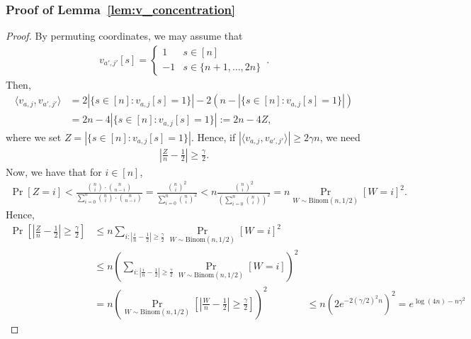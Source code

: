 \subsubsection{Proof of Lemma~\ref{lem:v_concentration}\label{sssec:lem:v_concentration}}
\begin{proof} By permuting coordinates, we may assume that 
\begin{align*}
v_{a',j'}[s] = \begin{cases} 1 & s \in [n]\\
-1 & s \in \{n+1,\dots,2n\}\end{cases}\,.
\end{align*}
Then,
\begin{align*}
\langle v_{a,j} , v_{a',j'}\rangle &= 2|\{s\in [n]: v_{a,j}[s] = 1\}| - 2(n - |\{s\in [n]: v_{a,j}[s] = 1\}|) \\
&= 2n - 4|\{s\in [n]: v_{a,j}[s] = 1\}| := 2n - 4Z,
\end{align*}
where we set $Z = |\{s\in [n]: v_{a,j}[s] = 1\}|$. Hence, if $|\langle v_{a,j} , v_{a',j'}\rangle|  \ge 2\gamma n$, we need
\begin{align*}
\left|\frac{Z}{n} - \frac{1}{2}\right| \ge \frac{\gamma}{2}.
\end{align*}
Now, we have that for $i \in [n]$,
\begin{align*}
\Pr[Z = i] < \frac{\binom{n}{i} \cdot \binom{n}{n-i}}{\sum_{i=0}^n \binom{n}{i} \cdot \binom{n}{n-i}} = \frac{\binom{n}{i}^2}{\sum_{i=0}^n \binom{n}{i}^2} < n\frac{\binom{n}{i}^2}{\left(\sum_{i=0}^n \binom{n}{i}\right)^2} = n\Pr_{W \sim \mathrm{Binom}(n,1/2)}[W=i]^2.
\end{align*}
Hence, 
\begin{align*}
\Pr\left[\left|\frac{Z}{n} - \frac{1}{2}\right| \ge \frac{\gamma}{2}\right] &\le n\sum_{i:|\frac{i}{n} - \frac{1}{2}| \ge \frac{\gamma}{2}} \Pr_{W \sim \mathrm{Binom}(n,1/2)}[W=i]^2\\
&\le n\left(\sum_{i:|\frac{i}{n} - \frac{1}{2}| \ge \frac{\gamma}{2}} \Pr_{W \sim \mathrm{Binom}(n,1/2)}[W=i]\right)^2\\
&= n\left(\Pr_{W \sim \mathrm{Binom}(n,1/2)}\left[\left|\frac{W}{n} - \frac{1}{2}\right| \ge \frac{\gamma}{2}\right]\right)^2 
&\le n(2e^{- 2(\gamma/2)^2 n})^2 = e^{ \log (4n) - n\gamma^2}
\end{align*}
\end{proof}


